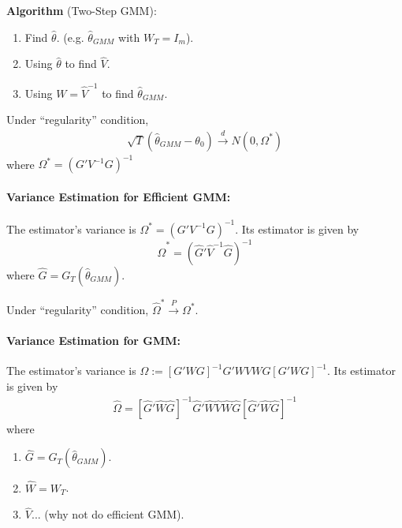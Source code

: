 \documentclass[11pt]{elegantbook}
\begin{document}
\textbf{Algorithm} (Two-Step GMM):
\begin{enumerate}
    \item Find $\hat{\theta}$. (e.g. $\hat{\theta}_{GMM}$ with $W_T=I_m$).
    \item Using $\hat{\theta}$ to find $\hat{V}$.
    \item Using $W=\hat{V}^{-1}$ to find $\hat{\theta}_{GMM}$.
\end{enumerate}
\begin{claim}
    Under ``regularity'' condition,
    \begin{equation}
        \begin{aligned}
            \sqrt{T}\left(\hat{\theta}_{GMM}-\theta_0\right) \stackrel{d}{\longrightarrow} N(0,\Omega^*)
        \end{aligned}
        \nonumber
    \end{equation}
    where $\Omega^*=(G'V^{-1}G)^{-1}$
\end{claim}

\paragraph*{Variance Estimation for Efficient GMM:} The estimator's variance is $\Omega^*=(G'V^{-1}G)^{-1}$. Its estimator is given by $$\hat{\Omega}^*=(\hat{G}'\hat{V}^{-1}\hat{G})^{-1}$$
where $\hat{G}=G_T(\hat{\theta}_{GMM})$.
\begin{claim}
    Under ``regularity'' condition, $\hat{\Omega}^* \stackrel{P}{\longrightarrow} \Omega^*$.
\end{claim}


\paragraph*{Variance Estimation for GMM:}
The estimator's variance is $\Omega:=\left[G'WG\right]^{-1}G'WVWG\left[G'WG\right]^{-1}$. Its estimator is given by
\begin{equation}
    \begin{aligned}
        \hat{\Omega}=\left[\hat{G}'\hat{W}\hat{G}\right]^{-1}\hat{G}'\hat{W}\hat{V}\hat{W}\hat{G}\left[\hat{G}'\hat{W}\hat{G}\right]^{-1}
    \end{aligned}
    \nonumber
\end{equation}
where
\begin{enumerate}
    \item $\hat{G}=G_T(\hat{\theta}_{GMM})$.
    \item $\hat{W}=W_T$.
    \item $\hat{V}...$ (why not do efficient GMM).
\end{enumerate}
\end{document}
